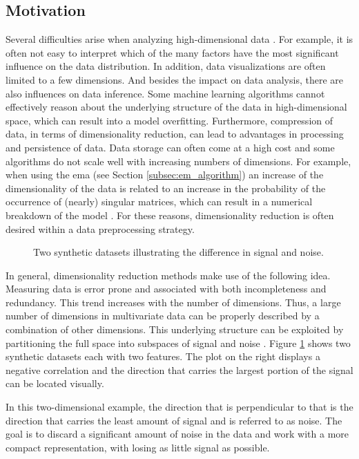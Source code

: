 \documentclass[../../../main.tex]{subfiles}
\begin{document}
\subsection{Motivation}

Several difficulties arise when analyzing high-dimensional data \cite[p.286]{dei_2020}. For example, it is often not easy to interpret which of the many factors have the most significant influence on the data distribution. In addition, data visualizations are often limited to a few dimensions. And besides the impact on data analysis, there are also influences on data inference. Some machine learning algorithms cannot effectively reason about the underlying structure of the data in high-dimensional space, which can result into a model overfitting. Furthermore, compression of data, in terms of dimensionality reduction, can lead to advantages in processing and persistence of data. Data storage can often come at a high cost and some algorithms do not scale well with increasing numbers of dimensions. For example, when using the \gls{ema} (see Section \ref{subsec:em_algorithm}) an increase of the dimensionality of the data is related to an increase in the probability of the occurrence of (nearly) singular matrices, which can result in a numerical breakdown of the model \cite[p.434]{bis_2006}. For these reasons, dimensionality reduction is often desired within a data preprocessing strategy.

\begin{figure}[b]
    \centering
    
    \caption[The difference in signal and noise of a dataset]{Two synthetic datasets illustrating the difference in signal and noise.}
    \label{fig:pca_signal_noise}
\end{figure}

In general, dimensionality reduction methods make use of the following idea. Measuring data is error prone and associated with both incompleteness and redundancy. This trend increases with the number of dimensions. Thus, a large number of dimensions in multivariate data can be properly described by a combination of other dimensions. This underlying structure can be exploited by partitioning the full space into subspaces of signal and noise \cite[217]{sco_2015}. Figure \ref{fig:pca_signal_noise} shows two synthetic datasets each with two features. The plot on the right displays a negative correlation and the direction that carries the largest portion of the signal can be located visually. 

In this two-dimensional example, the direction that is perpendicular to that is the direction that carries the least amount of signal and is referred to as noise. The goal is to discard a significant amount of noise in the data and work with a more compact representation, with losing as little signal as possible.
\end{document}
